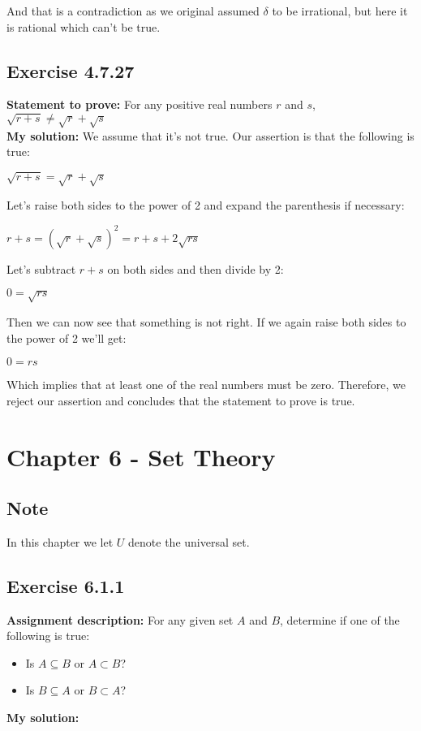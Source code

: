 \documentclass{article}
\newcommand{\cent}[1]{\begin{center}#1\end{center}}
\newcommand{\Prove}{\textbf{Statement to prove: }}
\newcommand{\Assign}{\textbf{Assignment description: }}
\newcommand{\Solution}{\textbf{My solution: }}
\newcommand{\QED}{\boxed{}}
\newcommand{\Exercise}[1]{\subsection{Exercise #1}}
\begin{document}
	And that is a contradiction as we original assumed $\delta$ to be irrational, but here it is rational which can't be true.\\
	\QED
	
	\Exercise{4.7.27}
	
	\Prove
	For any positive real numbers $r$ and $s$, $\sqrt{r+s} \neq \sqrt{r} + \sqrt{s}$\\
	
	\Solution
	We assume that it's not true. Our assertion is that the following is true:
	
	\cent{$\sqrt{r+s} = \sqrt{r} + \sqrt{s}$}
	
	Let's raise both sides to the power of 2 and expand the parenthesis if necessary:
	
	\cent{$r + s = (\sqrt{r} + \sqrt{s})^{2} = r + s + 2 \sqrt{rs}$}
	
	Let's subtract $r+s$ on both sides and then divide by 2:
	
	\cent{$0 = \sqrt{rs}$}
	
	Then we can now see that something is not right. If we again raise both sides to the power of 2 we'll get:
	
	\cent{$0 = rs$}
	
	Which implies that at least one of the real numbers must be zero. Therefore, we reject our assertion and concludes that the statement to prove is true.\\
	\QED
	
	\section{Chapter 6 - Set Theory}
	\subsection*{Note}
	In this chapter we let $U$ denote the universal set.
	
	\Exercise{6.1.1}
	
	\Assign
	For any given set $A$ and $B$, determine if one of the following is true:
	\begin{itemize}
		\item Is $A \subseteq B $ or $A \subset B$?
		\item Is $B \subseteq A$ or $B \subset A$?
	\end{itemize}

	\Solution
	
\end{document}
